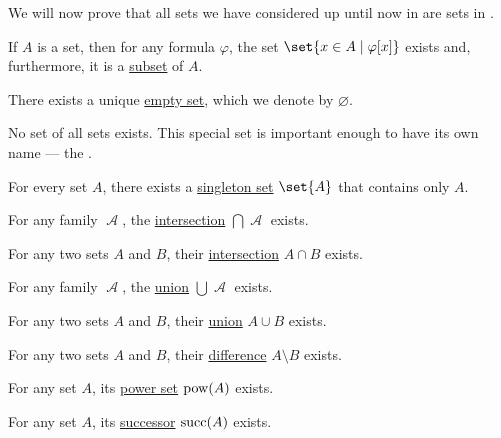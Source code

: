 \begin{proposition}\label{thm:zfc_existence_theorems}
  We will now prove that all sets we have considered up until now in  are sets in \hyperref[def:zfc]{}.

  \begin{thmenum}
     If \( A \) is a set, then for any formula \( \varphi \), the set \( \set{ x \in A \given \varphi[x] } \) exists and, furthermore, it is a \hyperref[def:subset]{subset} of \( A \).

     There exists a unique \hyperref[def:empty_set]{empty set}, which we denote by \( \varnothing \).

     No set of all sets exists. This special set is important enough to have its own name --- the .

     For every set \( A \), there exists a \hyperref[rem:singleton_sets]{singleton set} \( \set{ A } \) that contains only \( A \).

     For any  family \( \mscrA \), the \hyperref[def:basic_set_operations/intersection]{intersection} \( \bigcap \mscrA \) exists.

     For any two sets \( A \) and \( B \), their \hyperref[def:basic_set_operations/intersection]{intersection} \( A \cap B \) exists.

     For any family \( \mscrA \), the \hyperref[def:basic_set_operations/union]{union} \( \bigcup \mscrA \) exists.

     For any two sets \( A \) and \( B \), their \hyperref[def:basic_set_operations/union]{union} \( A \cup B \) exists.

     For any two sets \( A \) and \( B \), their \hyperref[def:basic_set_operations/difference]{difference} \( A \setminus B \) exists.

     For any set \( A \), its \hyperref[def:basic_set_operations/power_set]{power set} \( \operatorname{pow}(A) \) exists.

     For any set \( A \), its \hyperref[def:basic_set_operations/successor]{successor} \( \operatorname{succ}(A) \) exists.


\end{thmenum}
\end{proposition}
